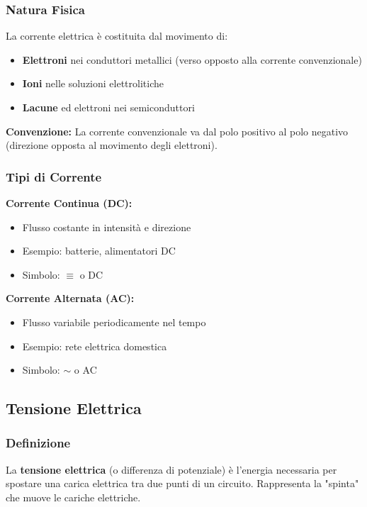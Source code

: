 \documentclass[a4paper,12pt]{article}
\begin{document}
\subsubsection{Natura Fisica}

La corrente elettrica è costituita dal movimento di:
\begin{itemize}
    \item \textbf{Elettroni} nei conduttori metallici (verso opposto alla corrente convenzionale)
    \item \textbf{Ioni} nelle soluzioni elettrolitiche
    \item \textbf{Lacune} ed elettroni nei semiconduttori
\end{itemize}

\textbf{Convenzione:} La corrente convenzionale va dal polo positivo al polo negativo (direzione opposta al movimento degli elettroni).

\subsubsection{Tipi di Corrente}

\textbf{Corrente Continua (DC):}
\begin{itemize}
    \item Flusso costante in intensità e direzione
    \item Esempio: batterie, alimentatori DC
    \item Simbolo: $\equiv$ o DC
\end{itemize}

\textbf{Corrente Alternata (AC):}
\begin{itemize}
    \item Flusso variabile periodicamente nel tempo
    \item Esempio: rete elettrica domestica
    \item Simbolo: $\sim$ o AC
\end{itemize}

\subsection{Tensione Elettrica}

\subsubsection{Definizione}

La \textbf{tensione elettrica} (o differenza di potenziale) è l'energia necessaria per spostare una carica elettrica tra due punti di un circuito. Rappresenta la "spinta" che muove le cariche elettriche.
\end{document}
